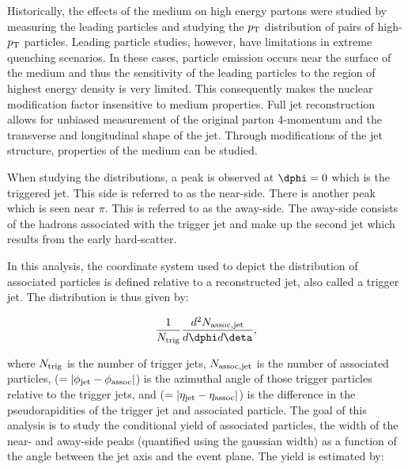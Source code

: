 

Historically, the effects of the medium on high energy partons were studied by measuring the leading particles and studying the \ensuremath{p_{\rm T}}\xspace distribution of pairs of high-\ensuremath{p_{\rm T}}\xspace particles.  Leading particle studies, however, have limitations in extreme quenching scenarios.  In these cases, particle emission occurs near the surface of the medium and thus the sensitivity of the leading particles to the region of highest energy density is very limited.  This consequently makes the nuclear modification factor insensitive to medium properties.  Full jet reconstruction allows for unbiased measurement of the original parton 4-momentum and the transverse and longitudinal  shape of the jet.  Through modifications of the jet structure, properties of the medium can be studied.  

When studying the \dphi distributions, a peak is observed at $\dphi = 0$ which is the triggered jet.  This side is referred to as the near-side.  There is another peak which is seen near $\pi$.  This is referred to as the away-side.  The away-side consists of the hadrons associated with the trigger jet and make up the second jet which results from the early hard-scatter.

In this analysis, the coordinate system used to depict the distribution of associated particles is defined relative to a reconstructed jet, also called a trigger jet. The distribution is thus given by:

\begin{equation}
	\frac{1}{N_{\rm trig}} \frac{d^2 N_{\rm assoc,jet}}{d\dphi d\deta},
	\label{Eq:JHCorrIntro}
\end{equation}

\noindent where $N_{\rm trig}$ is the number of trigger jets, $N_{\rm assoc,jet}$ is the number of associated particles, \dphi ($=|\phi_{\rm jet}-\phi_{\rm assoc}|$) is the azimuthal angle of those trigger particles relative to the trigger jets, and \deta ($=|\eta_{\rm jet}-\eta_{\rm assoc}|$) is the difference in the pseudorapidities of the trigger jet and associated particle.  %
The goal of this analysis is to study the conditional yield of associated particles, the width of the near- and away-side peaks (quantified using the gaussian width) as a function of the angle between the jet axis and the event plane.  The yield is estimated by:

